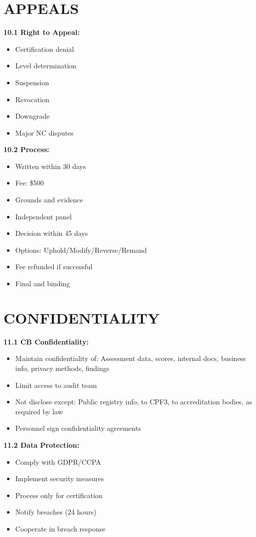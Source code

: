 \documentclass[11pt,a4paper]{article}
\begin{document}
\section{APPEALS}

\textbf{10.1 Right to Appeal:}
\begin{itemize}
\item Certification denial
\item Level determination
\item Suspension
\item Revocation
\item Downgrade
\item Major NC disputes
\end{itemize}

\textbf{10.2 Process:}
\begin{itemize}
\item Written within 30 days
\item Fee: \$500
\item Grounds and evidence
\item Independent panel
\item Decision within 45 days
\item Options: Uphold/Modify/Reverse/Remand
\item Fee refunded if successful
\item Final and binding
\end{itemize}

\section{CONFIDENTIALITY}

\textbf{11.1 CB Confidentiality:}
\begin{itemize}
\item Maintain confidentiality of: Assessment data, scores, internal docs, business info, privacy methods, findings
\item Limit access to audit team
\item Not disclose except: Public registry info, to CPF3, to accreditation bodies, as required by law
\item Personnel sign confidentiality agreements
\end{itemize}

\textbf{11.2 Data Protection:}
\begin{itemize}
\item Comply with GDPR/CCPA
\item Implement security measures
\item Process only for certification
\item Notify breaches (24 hours)
\item Cooperate in breach response
\end{itemize}
\end{document}
